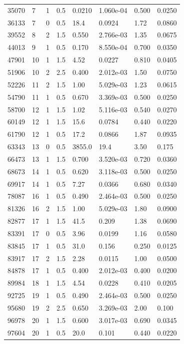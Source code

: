 \documentclass[preview]{standalone}
\begin{document}
{{\begin{tabular}{L{1.2cm}C{1.2cm} C{0.3cm}C{0.5cm} C{1.4cm}C{1.4cm} C{1.4cm}C{1.4cm}}
  35070  &     7  & 1     & 0.5 &  0.0210  & 1.060e-04  & 0.500 &  0.0250   \\ 
  36133  &     7  & 0     & 0.5 &  18.4  & 0.0924  & 1.72 &  0.0860   \\ 
  39552  &     8  & 2     & 1.5 &  0.550  & 2.766e-03  & 1.35 &  0.0675   \\ 
  44013  &     9  & 1     & 0.5 &  0.170  & 8.550e-04  & 0.700 &  0.0350   \\ 
  47901  &    10  & 1     & 1.5 &  4.52  & 0.0227  & 0.810 &  0.0405   \\ 
  51906  &    10  & 2     & 2.5 &  0.400  & 2.012e-03  & 1.50 &  0.0750   \\ 
  52226  &    11  & 2     & 1.5 &  1.00  & 5.029e-03  & 1.23 &  0.0615   \\ 
  54790  &    11  & 1     & 0.5 &  0.670  & 3.369e-03  & 0.500 &  0.0250   \\ 
  58700  &    12  & 1     & 1.5 &  1.02  & 5.116e-03  & 0.540 &  0.0270   \\ 
  60149  &    12  & 1     & 1.5 &  15.6  & 0.0784  & 0.440 &  0.0220   \\ 
  61790  &    12  & 1     & 0.5 &  17.2  & 0.0866  & 1.87 &  0.0935   \\ 
  63343  &    13  & 0     & 0.5 &  3855.0  & 19.4  & 3.50 &  0.175   \\ 
  66473  &    13  & 1     & 1.5 &  0.700  & 3.520e-03  & 0.720 &  0.0360   \\ 
  68673  &    14  & 1     & 0.5 &  0.620  & 3.118e-03  & 0.500 &  0.0250   \\ 
  69917  &    14  & 1     & 0.5 &  7.27  & 0.0366  & 0.680 &  0.0340   \\ 
  78087  &    16  & 1     & 0.5 &  0.490  & 2.464e-03  & 0.500 &  0.0250   \\ 
  81326  &    16  & 2     & 1.5 &  1.00  & 5.029e-03  & 1.80 &  0.0900   \\ 
  82877  &    17  & 1     & 1.5 &  41.5  & 0.209  & 1.38 &  0.0690   \\ 
  83391  &    17  & 0     & 0.5 &  3.96  & 0.0199  & 1.16 &  0.0580   \\ 
  83845  &    17  & 1     & 0.5 &  31.0  & 0.156  & 0.250 &  0.0125   \\ 
  83917  &    17  & 2     & 1.5 &  2.28  & 0.0115  & 1.00 &  0.0500   \\ 
  84878  &    17  & 1     & 0.5 &  0.400  & 2.012e-03  & 0.400 &  0.0200   \\ 
  89984  &    18  & 1     & 1.5 &  4.54  & 0.0228  & 0.410 &  0.0205   \\ 
  92725  &    19  & 1     & 0.5 &  0.490  & 2.464e-03  & 0.500 &  0.0250   \\ 
  95680  &    19  & 2     & 2.5 &  0.650  & 3.269e-03  & 2.00 &  0.100   \\ 
  96978  &    20  & 1     & 1.5 &  0.600  & 3.017e-03  & 0.690 &  0.0345   \\ 
  97604  &    20  & 1     & 0.5 &  20.0  & 0.101  & 0.440 &  0.0220   \\ 
\hline 
\end{tabular} 

}}
\end{document}
